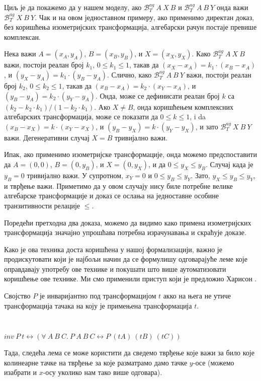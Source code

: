 \documentclass[a4paper, 12pt]{article}
\newcommand{\agbett}[3]{\ensuremath{\mathcal{B}_T^{\mathit{ag}}\ #1\ #2\ #3}}
\begin{document}
Циљ је да покажемо да у нашем моделу, ако $\agbett{A}{X}{B}$ и
$\agbett{A}{B}{Y}$ онда важи $\agbett{X}{B}{Y}$. Чак и на овом
једноставном примеру, ако применимо директан доказ, без коришћења
изометријских трансформација, алгебарски рачун постаје превише
комплексан.

Нека важи $A=(x_A, y_A)$, $B=(x_B, y_B)$, и $X=(x_X, y_X)$.  Како
$\agbett{A}{X}{B}$ важи, постоји реалан број $k_1$, $0 \le k_1 \le 1$,
такав да $(x_X - x_A) = k_1 \cdot (x_B - x_A)$, и $(y_X - y_A) = k_1
\cdot (y_B - y_A)$. Слично, како $\agbett{A}{B}{Y}$ важи, постоји
реалан број $k_2$, $0 \le k_2 \le 1$, такав да $(x_B - x_A) = k_2
\cdot (x_Y - x_A)$, и $(y_B - y_A) = k_2 \cdot (y_Y - y_A)$. Онда,
може се дефинисати реалан број $k$ са $(k_2 - k_2\cdot k_1) /
(1-k_2\cdot k_1).$ Ако $X\neq B$, онда коришћењем комплексних
алгебарских трансформација, може се показати да $0 \le k \le 1$, i da
$(x_B - x_X) = k \cdot (x_Y - x_X)$, и $(y_B - y_X) = k \cdot (y_Y -
y_X)$, и зато $\agbett{X}{B}{Y}$ важи. Дегенеративни случај $X=B$
тривијално важи.

Ипак, ако применимо изометријске трансформације, онда можемо
предспоставити да $A=(0, 0)$, $B=(0, y_B)$, и $X=(0, y_X)$, и да $0
\le y_X \le y_B$. Случај када је $y_B = 0$ тривијално важи. У
супротном, $x_Y = 0$ и $0 \le y_B \le y_Y$. Зато, $y_X \le y_B \le
y_Y$, и тврђење важи. Приметимо да у овом случају нису биле потребне
велике алгебарске трансформације и доказ се ослања на једноставне
особине транзитивности релације $\le$.

Поредећи претходна два доказа, можемо да видимо како примена
изометријских трансформација значајно упрошћава потребна израчунавања
и скраћује доказе.

Како је ова техника доста коришћена у нашој формализацији, важно је
продискутовати који је најбољи начин да се формулишу одговарајуће леме
које оправдавају употребу ове технике и покушати што више
аутоматизовати коришћење ове технике. Ми смо применили приступ који је
предложио Харисон \cite{wlog}.

Својство $P$ је инваријантно под трансформацијом $t$ акко на њега не 
утиче трансформација тачака на коју је примењена трансформација $t$.

{\tt
\begin{tabbing}
$inv\ P\ t \longleftrightarrow (\forall\ A\ B\ C.\ P\ A\ B\ C
\longleftrightarrow P\ (t A)\ (t B)\ (t C))$
\end{tabbing}
}

Тада, следећа лема се може користити да сведемо тврђење које важи за
било које колинеарне тачке на тврђење за које разматрамо дамо тачке
$y$-осе (можемо изабрати и $x$-осу уколико нам тако више одговара).
\end{document}
